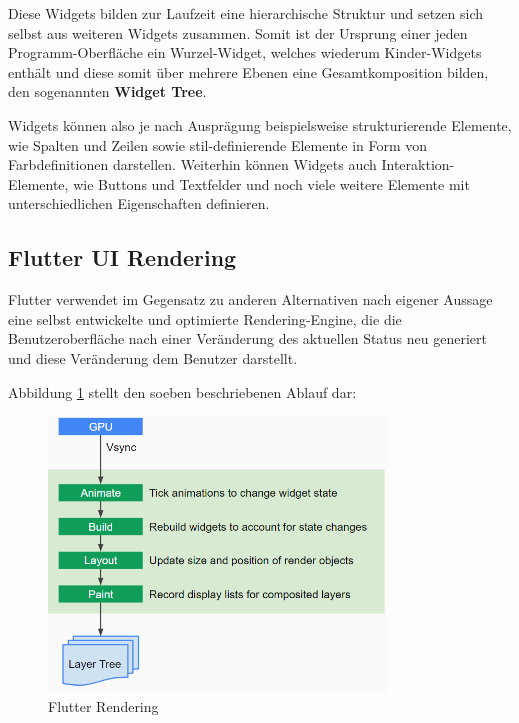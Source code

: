 \documentclass[bibliography=totoc,listof=totoc,BCOR=5mm,DIV=12,oneside]{scrbook}
\begin{document}
\par \bigskip Diese Widgets bilden zur Laufzeit eine hierarchische Struktur und setzen sich selbst aus weiteren Widgets zusammen. Somit ist der Ursprung einer jeden Programm-Oberfläche ein Wurzel-Widget, welches wiederum Kinder-Widgets enthält und diese somit über mehrere Ebenen eine Gesamtkomposition bilden, den sogenannten \textbf{Widget Tree}. 

\par \bigskip Widgets können also je nach Ausprägung beispielsweise strukturierende Elemente, wie Spalten und Zeilen sowie stil-definierende Elemente in Form von Farbdefinitionen darstellen. Weiterhin können Widgets auch Interaktion-Elemente, wie Buttons und Textfelder und noch viele weitere Elemente mit unterschiedlichen Eigenschaften definieren.

\subsection{Flutter UI Rendering}
\par Flutter verwendet im Gegensatz zu anderen Alternativen nach eigener Aussage eine selbst entwickelte und optimierte Rendering-Engine, die die Benutzeroberfläche nach einer Veränderung des aktuellen Status neu generiert und diese Veränderung dem Benutzer darstellt\citep{Flu3}. 

\par \bigskip Abbildung \ref{img:flutterHighLevelRendering} stellt den soeben beschriebenen Ablauf dar:

\bigskip
\begin{figure}[H]
	\centering
	\includegraphics[width=0.8\textwidth, keepaspectratio]{Bilder/FlutterRendering.png}
	\caption{Flutter Rendering \cite{Flu5}}
	\label{img:flutterHighLevelRendering}
\end{figure}
\end{document}
